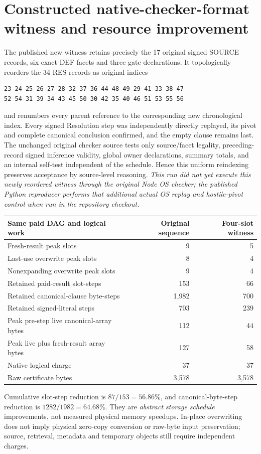 \documentclass[11pt]{article}
\begin{document}
\section*{Constructed native-checker-format witness and resource improvement}
The published new witness retains precisely the 17 original signed SOURCE records, six exact DEF facets and three gate declarations. It topologically reorders the 34 RES records as original indices
\begin{verbatim}
23 24 25 26 27 28 32 37 36 44 48 49 29 41 33 38 47
52 54 31 39 34 43 45 50 30 42 35 40 46 51 53 55 56
\end{verbatim}
and renumbers every parent reference to the corresponding new chronological index. Every signed Resolution step was independently directly replayed, its pivot and complete canonical conclusion confirmed, and the empty clause remains last. The unchanged original checker source tests only source/facet legality, preceding-record signed inference validity, global owner declarations, summary totals, and an internal self-test independent of the schedule. Hence this uniform reindexing preserves acceptance by source-level reasoning. \emph{This run did not yet execute this newly reordered witness through the original Node OS checker; the published Python reproducer performs that additional actual OS replay and hostile-pivot control when run in the repository checkout.}

\begin{center}
\begin{tabular}{lrr}
\toprule
Same paid DAG and logical work & Original sequence & Four-slot witness\\
\midrule
Fresh-result peak slots & 9 & 5\\
Last-use overwrite peak slots & 8 & 4\\
Nonexpanding overwrite peak slots & 9 & 4\\
Retained paid-result slot-steps & 153 & 66\\
Retained canonical-clause byte-steps & 1,982 & 700\\
Retained signed-literal steps & 703 & 239\\
Peak pre-step live canonical-array bytes & 112 & 44\\
Peak live plus fresh-result array bytes & 127 & 58\\
Native logical charge & 37 & 37\\
Raw certificate bytes & 3,578 & 3,578\\
\bottomrule
\end{tabular}
\end{center}
Cumulative slot-step reduction is $87/153=56.86\%$, and canonical-byte-step reduction is $1282/1982=64.68\%$. They are \emph{abstract storage schedule} improvements, not measured physical memory speedups. In-place overwriting does not imply physical zero-copy conversion or raw-byte input preservation; source, retrieval, metadata and temporary objects still require independent charges.
\end{document}
